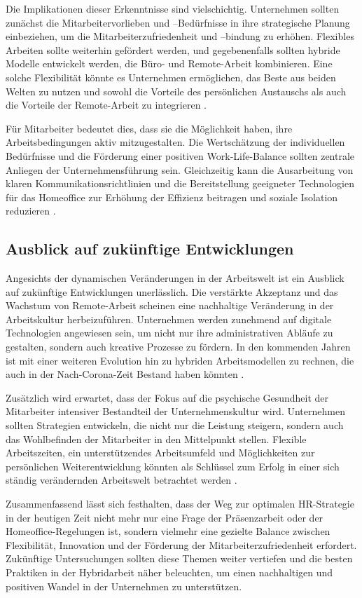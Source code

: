 Die Implikationen dieser Erkenntnisse sind vielschichtig. Unternehmen sollten zunächst die Mitarbeitervorlieben und –Bedürfnisse in ihre strategische Planung einbeziehen, um die Mitarbeiterzufriedenheit und –bindung zu erhöhen. Flexibles Arbeiten sollte weiterhin gefördert werden, und gegebenenfalls sollten hybride Modelle entwickelt werden, die Büro- und Remote-Arbeit kombinieren. Eine solche Flexibilität könnte es Unternehmen ermöglichen, das Beste aus beiden Welten zu nutzen und sowohl die Vorteile des persönlichen Austauschs als auch die Vorteile der Remote-Arbeit zu integrieren \cite{file2}.

Für Mitarbeiter bedeutet dies, dass sie die Möglichkeit haben, ihre Arbeitsbedingungen aktiv mitzugestalten. Die Wertschätzung der individuellen Bedürfnisse und die Förderung einer positiven Work-Life-Balance sollten zentrale Anliegen der Unternehmensführung sein. Gleichzeitig kann die Ausarbeitung von klaren Kommunikationsrichtlinien und die Bereitstellung geeigneter Technologien für das Homeoffice zur Erhöhung der Effizienz beitragen und soziale Isolation reduzieren \cite{file4}.

\subsection{Ausblick auf zukünftige Entwicklungen}

Angesichts der dynamischen Veränderungen in der Arbeitswelt ist ein Ausblick auf zukünftige Entwicklungen unerlässlich. Die verstärkte Akzeptanz und das Wachstum von Remote-Arbeit scheinen eine nachhaltige Veränderung in der Arbeitskultur herbeizuführen. Unternehmen werden zunehmend auf digitale Technologien angewiesen sein, um nicht nur ihre administrativen Abläufe zu gestalten, sondern auch kreative Prozesse zu fördern. In den kommenden Jahren ist mit einer weiteren Evolution hin zu hybriden Arbeitsmodellen zu rechnen, die auch in der Nach-Corona-Zeit Bestand haben könnten \cite{file1}.

Zusätzlich wird erwartet, dass der Fokus auf die psychische Gesundheit der Mitarbeiter intensiver Bestandteil der Unternehmenskultur wird. Unternehmen sollten Strategien entwickeln, die nicht nur die Leistung steigern, sondern auch das Wohlbefinden der Mitarbeiter in den Mittelpunkt stellen. Flexible Arbeitszeiten, ein unterstützendes Arbeitsumfeld und Möglichkeiten zur persönlichen Weiterentwicklung könnten als Schlüssel zum Erfolg in einer sich ständig verändernden Arbeitswelt betrachtet werden \cite{file2}.

Zusammenfassend lässt sich festhalten, dass der Weg zur optimalen HR-Strategie in der heutigen Zeit nicht mehr nur eine Frage der Präsenzarbeit oder der Homeoffice-Regelungen ist, sondern vielmehr eine gezielte Balance zwischen Flexibilität, Innovation und der Förderung der Mitarbeiterzufriedenheit erfordert. Zukünftige Untersuchungen sollten diese Themen weiter vertiefen und die besten Praktiken in der Hybridarbeit näher beleuchten, um einen nachhaltigen und positiven Wandel in der Unternehmen zu unterstützen.